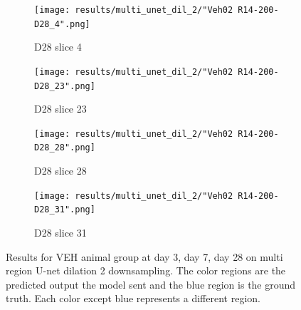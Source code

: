 \begin{figure}[!htb]
\medskip
\begin{subfigure}{0.25\textwidth}
  \texttt{[image: results/multi\_unet\_dil\_2/"Veh02 R14-200-D28\_4".png]}
  \caption{D28 slice 4}
\end{subfigure}\hfil %
\begin{subfigure}{0.25\textwidth}
  \texttt{[image: results/multi\_unet\_dil\_2/"Veh02 R14-200-D28\_23".png]}
  \caption{D28 slice 23}
\end{subfigure}\hfil %
\begin{subfigure}{0.25\textwidth}
  \texttt{[image: results/multi\_unet\_dil\_2/"Veh02 R14-200-D28\_28".png]}
  \caption{D28 slice 28}
\end{subfigure}\hfil %
\begin{subfigure}{0.25\textwidth}
  \texttt{[image: results/multi\_unet\_dil\_2/"Veh02 R14-200-D28\_31".png]}
  \caption{D28 slice 31}
\end{subfigure}
  
  \caption{Results for VEH animal group at day 3, day 7, day 28 on multi region U-net dilation 2 downsampling. The color regions are the predicted output the model sent and the blue region is the ground truth. Each color except blue represents a different region.}
  \label{fig:results_multi_unetdil2_VEH}
\end{figure}



